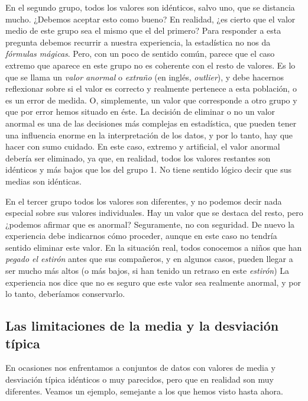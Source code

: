\documentclass[
  letterpaper,
  DIV=11,
  numbers=noendperiod,
  oneside]{scrreprt}
\begin{document}
En el segundo grupo, todos los valores son idénticos, salvo uno, que se
distancia mucho. ¿Debemos aceptar esto como bueno? En realidad, ¿es
cierto que el valor medio de este grupo sea el mismo que el del primero?
Para responder a esta pregunta debemos recurrir a nuestra experiencia,
la estadística no nos da \emph{fórmulas mágicas}. Pero, con un poco de
sentido común, parece que el caso extremo que aparece en este grupo no
es coherente con el resto de valores. Es lo que se llama un \emph{valor
anormal} o \emph{extraño} (en inglés, \emph{outlier}), y debe hacernos
reflexionar sobre si el valor es correcto y realmente pertenece a esta
población, o es un error de medida. O, simplemente, un valor que
corresponde a otro grupo y que por error hemos situado en éste. La
decisión de eliminar o no un valor anormal es una de las decisiones más
complejas en estadística, que pueden tener una influencia enorme en la
interpretación de los datos, y por lo tanto, hay que hacer con sumo
cuidado. En este caso, extremo y artificial, el valor anormal debería
ser eliminado, ya que, en realidad, todos los valores restantes son
idénticos y más bajos que los del grupo 1. No tiene sentido lógico decir
que sus medias son idénticas.

En el tercer grupo todos los valores son diferentes, y no podemos decir
nada especial sobre sus valores individuales. Hay un valor que se
destaca del resto, pero ¿podemos afirmar que es anormal? Seguramente, no
con seguridad. De nuevo la experiencia debe indicarnos cómo proceder,
aunque en este caso no tendría sentido eliminar este valor. En la
situación real, todos conocemos a niños que han \emph{pegado el estirón}
antes que sus compañeros, y en algunos casos, pueden llegar a ser mucho
más altos (o más bajos, si han tenido un retraso en este \emph{estirón})
La experiencia nos dice que no es seguro que este valor sea realmente
anormal, y por lo tanto, deberíamos conservarlo.

\hypertarget{las-limitaciones-de-la-media-y-la-desviaciuxf3n-tuxedpica}{%
\subsection{Las limitaciones de la media y la desviación
típica}\label{las-limitaciones-de-la-media-y-la-desviaciuxf3n-tuxedpica}}

En ocasiones nos enfrentamos a conjuntos de datos con valores de media y
desviación típica idénticos o muy parecidos, pero que en realidad son
muy diferentes. Veamos un ejemplo, semejante a los que hemos visto hasta
ahora.
\end{document}
